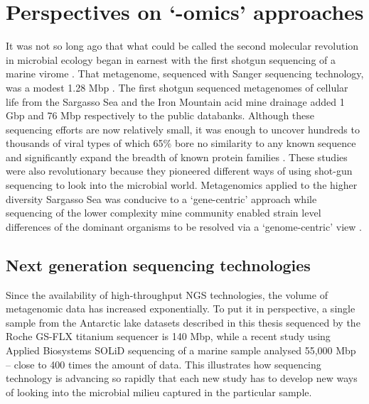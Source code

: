 \section{Perspectives on `-omics' approaches }
It was not so long ago that what could be called the second molecular revolution in microbial ecology began in earnest with the first shotgun  sequencing of a marine virome \cite{Breitbart2002}.
That metagenome, sequenced with Sanger sequencing technology, was a modest 1.28 Mbp \cite{Breitbart2002}.
The first shotgun sequenced metagenomes of cellular life from the Sargasso Sea \cite{Venter2004} and the Iron Mountain acid mine drainage \cite{Tyson2004} added 1 Gbp and 76 Mbp respectively to the public databanks.
Although these sequencing efforts are now relatively small, it was enough to uncover hundreds to thousands of viral types of which 65\% bore no similarity to any known sequence \cite{Breitbart2002} and significantly expand the breadth of known protein families \cite{Venter2004}.  
These studies were also revolutionary because they pioneered different ways of using shot-gun sequencing to look into the microbial world.
Metagenomics applied to the higher diversity Sargasso Sea was conducive to a `gene-centric' approach \cite{Venter2004} while sequencing of the lower complexity mine community enabled strain level differences of the dominant organisms to be resolved via a `genome-centric' view \cite{Tyson2004}.


\subsection{Next generation sequencing technologies}
Since the availability of high-throughput \ac{NGS} technologies, the volume of metagenomic data has increased exponentially.
To put it in perspective, a single sample from the Antarctic lake datasets described in this thesis sequenced by the Roche GS-FLX titanium sequencer is 140 Mbp, while a recent study using Applied Biosystems SOLiD sequencing of a marine sample \cite{Iverson2012} analysed 55,000 Mbp -- close to 400 times the amount of data.
This illustrates how sequencing technology is advancing so rapidly that each new study has to develop new ways of looking into the microbial milieu captured in the particular sample.

